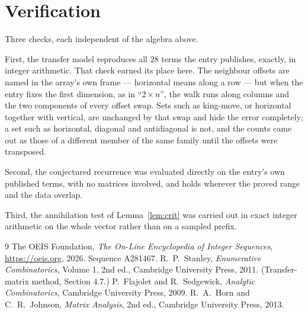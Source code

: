 \documentclass[11pt,a4paper]{article}
\theoremstyle{plain}
\theoremstyle{definition}
\begin{document}
\section{Verification}

Three checks, each independent of the algebra above.

First, the transfer model reproduces all $28$ terms the entry publishes, exactly, in
integer arithmetic. That check earned its place here. The neighbour offsets are named in the
array's own frame --- horizontal means along a row --- but when the entry fixes the first
dimension, as in ``$2\times n$'', the walk runs along columns and the two components of every
offset swap. Sets such as king-move, or horizontal together with vertical, are unchanged by
that swap and hide the error completely; a set such as horizontal, diagonal and antidiagonal
is not, and the counts came out as those of a different member of the same family until the
offsets were transposed.

Second, the conjectured recurrence was evaluated directly on the entry's own published terms,
with no matrices involved, and holds wherever the proved range and the data overlap.

Third, the annihilation test of Lemma~\ref{lem:crit} was carried out in exact integer
arithmetic on the whole vector rather than on a sampled prefix.

\begin{thebibliography}{9}
 The OEIS Foundation, \emph{The On-Line Encyclopedia of Integer
Sequences}, \url{https://oeis.org}, 2026. Sequence A281467.
 R.~P.~Stanley, \emph{Enumerative Combinatorics}, Volume 1, 2nd ed.,
Cambridge University Press, 2011. (Transfer-matrix method, Section 4.7.)
 P.~Flajolet and R.~Sedgewick, \emph{Analytic Combinatorics}, Cambridge
University Press, 2009.
 R.~A.~Horn and C.~R.~Johnson, \emph{Matrix Analysis}, 2nd ed., Cambridge
University Press, 2013.
\end{thebibliography}
\end{document}
